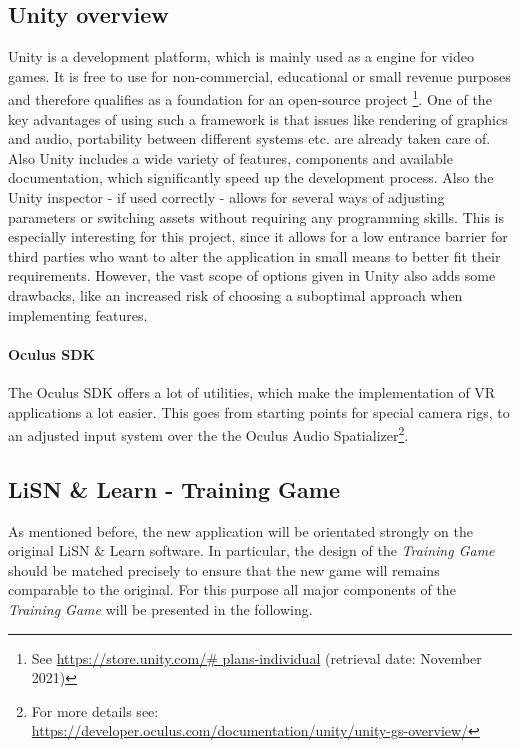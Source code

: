 \documentclass[a4paper,11pt]{article}%
\renewcommand{\\}{\vspace*{0.5\baselineskip} \newline}
\begin{document}
\subsection{Unity overview}
\label{sec:unity}
Unity is a development platform, which is mainly used as a engine for video games. It is free to use for non-commercial, educational or small revenue purposes and therefore qualifies as a foundation for an open-source project \footnote{See \url{https://store.unity.com/\# plans-individual} (retrieval date: November 2021)}. One of the key advantages of using such a framework is that issues like rendering of graphics and audio, portability between different systems etc. are already taken care of. Also Unity includes a wide variety of features, components and available documentation, which significantly speed up the development process. Also the Unity inspector - if used correctly - allows for several ways of adjusting parameters or switching assets without requiring any programming skills. This is especially interesting for this project, since it allows for a low entrance barrier for third parties who want to alter the application in small means to better fit their requirements. However, the vast scope of options given in Unity also adds some drawbacks, like an increased risk of choosing a suboptimal approach when implementing features.

\paragraph{Oculus SDK} The Oculus \acs{SDK} offers a lot of utilities, which make the implementation of  \ac{VR} applications a lot easier. This goes from starting points for special camera rigs, to an adjusted input system over the the Oculus Audio Spatializer\footnote{For more details see: \url{https://developer.oculus.com/documentation/unity/unity-gs-overview/}}.


\subsection{LiSN \& Learn - Training Game}
As mentioned before, the new application will be orientated strongly on the original \ac{LiSN} \& Learn software. In particular, the design of the \textit{Training Game} should be matched precisely to ensure that the new game will remains comparable to the original. For this purpose all major components of the \textit{Training Game} will be presented in the following.
\end{document}
